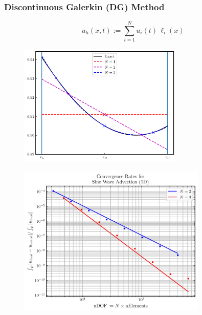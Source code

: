 \documentclass{beamer}
\begin{document}
\begin{frame}
\frametitle{Discontinuous Galerkin (DG) Method}

  \Fontvi

  \begin{equation*}
    u_{h}\left(x,t\right)
    :=\sum\limits_{i=1}^{N}
      u_{i}\left(t\right)\,\ell_{i}\left(x\right)
  \end{equation*}

  \begin{figure}[htb!]
    \centering
    \includegraphics[width=0.7\textwidth]{fig.DG_1D.png}
  \end{figure}

\end{frame}

\begin{frame}

  \begin{figure}[htb!]
    \centering
    \includegraphics[width=0.8\textwidth]{fig.ConvergenceRates.png}
  \end{figure}

\end{frame}
\end{document}
